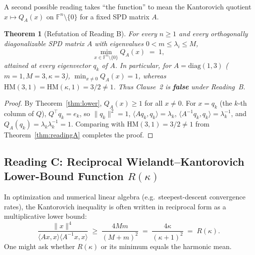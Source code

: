 \documentclass[11pt,a4paper]{article}
\newtheorem{theorem}{Theorem}[section]
\theoremstyle{definition}
\newcommand{\HM}{\mathrm{HM}}
\newcommand{\diag}{\mathrm{diag}}
\begin{document}
A second possible reading takes ``the function'' to mean the Kantorovich
quotient $x \mapsto Q_A(x)$ on $\mathbb{F}^n \setminus \{0\}$ for a fixed SPD
matrix $A$.

\begin{theorem}[Refutation of Reading B]
\label{thm:readingB}
For every $n \ge 1$ and every orthogonally diagonalizable SPD matrix $A$ with
eigenvalues $0 < m \le \lambda_i \le M$,
\[
  \min_{x \in \mathbb{F}^n \setminus \{0\}} Q_A(x) \;=\; 1,
\]
attained at every eigenvector $q_k$ of $A$. In particular, for
$A = \diag(1, 3)$ ($m = 1, M = 3, \kappa = 3$), $\min_{x \ne 0} Q_A(x) = 1$,
whereas $\HM(3, 1) = \HM(\kappa, 1) = 3/2 \ne 1$. Thus Clause~2 is \textbf{false}
under Reading~B.
\end{theorem}
\begin{proof}
By Theorem~\ref{thm:lower}, $Q_A(x) \ge 1$ for all $x \ne 0$. For $x = q_k$ (the
$k$-th column of $Q$), $Q^\top q_k = e_k$, so $\|q_k\|^2 = 1$,
$\langle Aq_k, q_k\rangle = \lambda_k$, $\langle A^{-1}q_k, q_k\rangle = \lambda_k^{-1}$,
and $Q_A(q_k) = \lambda_k \lambda_k^{-1} = 1$. Comparing with $\HM(3,1) = 3/2 \ne 1$
from Theorem~\ref{thm:readingA} completes the proof.
\end{proof}

\subsection{Reading C: Reciprocal Wielandt--Kantorovich Lower-Bound Function \texorpdfstring{$R(\kappa)$}{R(kappa)}}

In optimization and numerical linear algebra (e.g.\ steepest-descent convergence
rates), the Kantorovich inequality is often written in reciprocal form as a
multiplicative lower bound:
\[
  \frac{\|x\|^4}{\langle Ax, x\rangle \langle A^{-1}x, x\rangle}
  \;\ge\; \frac{4Mm}{(M + m)^2}
  \;=\; \frac{4\kappa}{(\kappa + 1)^2}
  \;=\; R(\kappa).
\]
One might ask whether $R(\kappa)$ or its minimum equals the harmonic mean.
\end{document}
